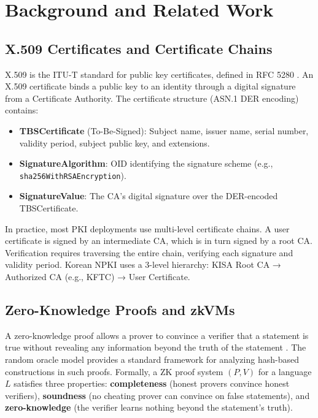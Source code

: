 \documentclass[11pt, a4paper]{article}
\providecommand{\tightlist}{%
  \setlength{\itemsep}{0pt}\setlength{\parskip}{0pt}}
\begin{document}
\section{Background and Related
Work}\label{background-and-related-work}

\subsection{X.509 Certificates and Certificate
Chains}\label{x.509-certificates-and-certificate-chains}

X.509 is the ITU-T standard for public key certificates, defined in RFC
5280 \cite{ref4}. An X.509 certificate binds a public key to an identity
through a digital signature from a Certificate Authority. The
certificate structure (ASN.1 DER encoding) contains:

\begin{itemize}
\tightlist
\item
  \textbf{TBSCertificate} (To-Be-Signed): Subject name, issuer name,
  serial number, validity period, subject public key, and extensions.
\item
  \textbf{SignatureAlgorithm}: OID identifying the signature scheme
  (e.g., \texttt{sha256WithRSAEncryption}).
\item
  \textbf{SignatureValue}: The CA's digital signature over the
  DER-encoded TBSCertificate.
\end{itemize}

In practice, most PKI deployments use multi-level certificate chains. A
user certificate is signed by an intermediate CA, which is in turn
signed by a root CA. Verification requires traversing the entire chain,
verifying each signature and validity period. Korean NPKI uses a 3-level
hierarchy: KISA Root CA → Authorized CA (e.g., KFTC) → User
Certificate.

\subsection{Zero-Knowledge Proofs and
zkVMs}\label{zero-knowledge-proofs-and-zkvms}

A zero-knowledge proof allows a prover to convince a verifier that a
statement is true without revealing any information beyond the truth of
the statement \cite{ref5}. The random oracle model \cite{ref15} provides a
standard framework for analyzing hash-based constructions in such
proofs. Formally, a ZK proof system \((P, V)\) for a language \(L\)
satisfies three properties: \textbf{completeness} (honest provers
convince honest verifiers), \textbf{soundness} (no cheating prover can
convince on false statements), and \textbf{zero-knowledge} (the verifier
learns nothing beyond the statement's truth).
\end{document}

